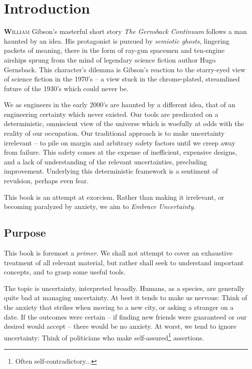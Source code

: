 \documentclass[../primer.tex]{subfiles}
\begin{document}
\chapter{Introduction}
\lettrine[findent=2pt]{\textbf{W}}{illiam} Gibson's masterful short story
\emph{The Gernsback Continuum}\cite{gibson1986chrome} follows a man haunted by
an idea. His protagonist is pursued by \emph{semiotic ghosts}, lingering packets
of meaning, there in the form of ray-gun spacemen and ten-engine airships sprung
from the mind of legendary science fiction author Hugo Gernsback. This
character's dilemma is Gibson's reaction to the starry-eyed view of science
fiction in the 1970's -- a view stuck in the chrome-plated, streamlined future
of the 1930's which could never be.

We as engineers in the early 2000's are haunted by a different idea, that of an
engineering certainty which never existed. Our tools are predicated on a
deterministic, omniscient view of the universe which is woefully at odds with the
reality of our occupation. Our traditional approach is to make uncertainty
irrelevant -- to pile on margin and arbitrary safety factors until we creep away
from failure. This safety comes at the expense of inefficient, expensive
designs, and a lack of understanding of the relevant uncertainties, precluding
improvement. Underlying this deterministic framework is a sentiment of
revulsion, perhaps even fear.

This book is an attempt at exorcism. Rather than making it irrelevant, or
becoming paralyzed by anxiety, we aim to \emph{Embrace Uncertainty}.

\section{Purpose}
This book is foremost a \emph{primer}. We shall not attempt to cover an
exhaustive treatment of all relevant material, but rather shall seek to
understand important concepts, and to grasp some useful tools.

The topic is uncertainty, interpreted broadly. Humans, as a species, are
generally quite bad at managing uncertainty. At best it tends to make us
nervous: Think of the anxiety that strikes when moving to a new city, or asking
a stranger on a date. If the outcomes were certain -- if finding new friends
were guaranteed or our desired would accept -- there would be no anxiety. At
worst, we tend to ignore uncertainty: Think of politicians who make
self-assured\footnote{Often self-contradictory...} assertions.
\end{document}
